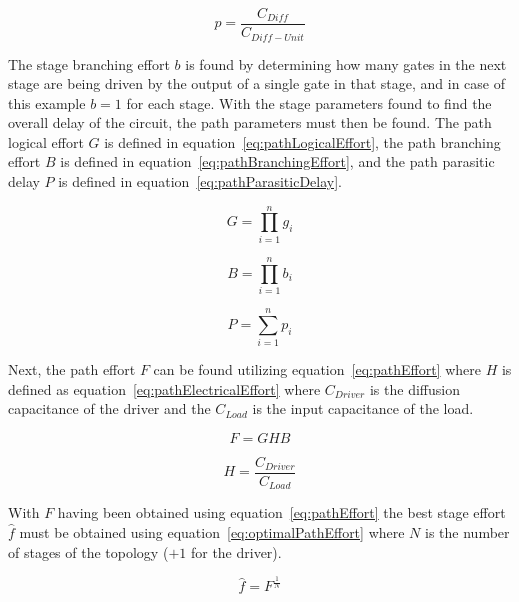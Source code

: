 \documentclass[conference]{IEEEtran}
\begin{document}
\begin{equation}
p = \frac{C_{Diff}}{C_{Diff-Unit}}
\label{eq:stageParasiticDelay}
\end{equation}

The stage branching effort $b$ is found by determining how many gates in the next stage are being driven by the output of a single gate in that stage, and in case of this example $b = 1$ for each stage. With the stage parameters found to find the overall delay of the circuit, the path parameters must then be found. The path logical effort $G$ is defined in equation~\ref{eq:pathLogicalEffort}, the path branching effort $B$ is defined in equation~\ref{eq:pathBranchingEffort}, and the path parasitic delay $P$ is defined in equation~\ref{eq:pathParasiticDelay}.


\begin{equation}
G = \prod_{i=1}^{n}{g_i}
\label{eq:pathLogicalEffort}
\end{equation}

\begin{equation}
B = \prod_{i=1}^{n}{b_i}
\label{eq:pathBranchingEffort}
\end{equation}

\begin{equation}
P = \sum_{i=1}^{n}{p_i}
\label{eq:pathParasiticDelay}
\end{equation} 

Next, the path effort $F$ can be found utilizing equation~\ref{eq:pathEffort} where $H$ is defined as equation~\ref{eq:pathElectricalEffort} where $C_{Driver}$ is the diffusion capacitance of the driver and the $C_{Load}$ is the input capacitance of the load. 

\begin{equation}
F = GHB
\label{eq:pathEffort}
\end{equation}

\begin{equation}
H = \frac{C_{Driver}}{C_{Load}}
\label{eq:pathElectricalEffort}
\end{equation}

With $F$ having been obtained using equation~\ref{eq:pathEffort} the best stage effort $\hat{f}$ must be obtained using equation~\ref{eq:optimalPathEffort} where $N$ is the number of stages of the topology ($+ 1$ for the driver). 

\begin{equation}
\hat{f} = F^{\frac{1}{N}}
\label{eq:optimalPathEffort}
\end{equation}
\end{document}
